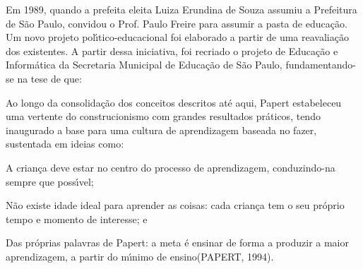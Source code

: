 \documentclass[
12pt,		%
openright,	%
twoside,  %
a4paper,			%
chapter=TITLE,		%
english,			%
french,				%
spanish,			%
brazil				%
]{USPSC-classe/USPSC}
\begin{document}
Em 1989, quando a prefeita eleita Luiza Erundina de Souza assumiu a Prefeitura de S\~ao Paulo, convidou o Prof. Paulo Freire para assumir a pasta de educa\c{c}\~ao. Um novo projeto pol\'{\i}tico-educacional foi elaborado a partir de uma reavalia\c{c}\~ao dos existentes. A partir dessa iniciativa, foi recriado o projeto de Educa\c{c}\~ao e Inform\'atica da Secretaria Municipal de Educa\c{c}\~ao de S\~ao Paulo, fundamentando-se na tese de que:










\noindent\begin{center}\mbox{\centering{}}\end{center}


Ao longo da consolida\c{c}\~ao dos conceitos descritos at\'e aqui, Papert estabeleceu uma vertente do construcionismo com grandes resultados pr\'aticos, tendo inaugurado a base para uma cultura de aprendizagem baseada no \textquotedbl fazer\textquotedbl , sustentada em ideias como:










\begin{alineas}
\item A crian\c{c}a deve estar no centro do processo de aprendizagem, conduzindo-na sempre que poss\'{\i}vel;
\item N\~ao existe idade ideal para aprender as coisas: cada crian\c{c}a tem o seu pr\'oprio tempo e momento de interesse; e
\item Das pr\'oprias palavras de Papert: \textquotedbl a meta \'e ensinar de forma a produzir a maior aprendizagem, a partir do m\'{\i}nimo de ensino\textquotedbl   (PAPERT, 1994).
\end{alineas}
\end{document}
